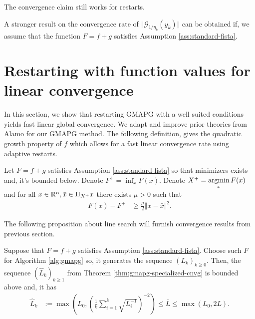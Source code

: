 \documentclass[12pt]{report}
\begin{document}
        \begin{remark}
            The convergence claim still works for restarts. 
        \end{remark}
        \par
        A stronger result on the convergence rate of $\Vert \mathcal G_{1/\eta_k}(y_k)\Vert$ can be obtained if, we assume that the function $F=f + g$ satisfies Assumption \ref{ass:standard-fista}. 
    
    \section{Restarting with function values for linear convergence}
        In this section, we show that restarting GMAPG with a well suited conditions yields fast linear global convergence. 
        We adapt and improve prior theories from Alamo \cite{alamo_restart_2019} for our GMAPG method. 
        The following definition, gives the quadratic growth property of $f$ which allows for a fast linear convergence rate using adaptive restarts. 
        \begin{assumption}\label{ass:q-growth-ch2}
            Let $F = f + g$ satisfies Assumption \ref{ass:standard-fista} so that minimizers exists and, it's bounded below. 
            Denote $F^+ = \inf_{x} F(x)$. 
            Denote $X^+ = \mathop{\rm argmin}\limits_{x} F(x)$ and for all $x \in \mathbb R^n, \bar x \in \Pi_{X^+}x$ there exists $\mu > 0$ such that 
            \begin{align*}
                F(x) - F^+ &\ge \frac{\mu}{2}\Vert x - \bar x\Vert^2. 
            \end{align*}
        \end{assumption}
        The following proposition about line search will furnish convergence results from previous section. 
        \begin{proposition}\label{prop:bnded-lip-ls}
            Suppose that $F = f + g$ satisfies Assumption \ref{ass:standard-fista}. 
            Choose such $F$ for Algorithm \ref{alg:gmapg} so, it generates the sequence $(L_k)_{k\ge 0}$. 
            Then, the sequence $(\hat L_k)_{k \ge 1}$ from Theorem \ref{thm:gmapg-specialized-cnvg} is bounded above and, it has
            \begin{align*}
                \widehat L_k &:= \max\left(
                    L_0, \left(
                        \frac{1}{k} \sum_{i = 1}^{k} \sqrt{L_i^{-1}}
                    \right)^{-2}
                \right)\le  \overline L \le \max\left(L_0,  2L\right). 
            \end{align*}
        \end{proposition}
\end{document}
